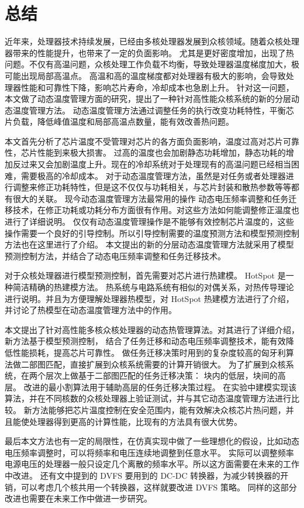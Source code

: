 
\chapter{总结}

近年来，处理器技术持续发展，已经由多核处理器发展到众核领域。随着众核处理器带来的性能提升，也带来了一定的负面影响。
尤其是更好密度增加，出现了热问题。不仅有高温问题，众核处理工作负载不均衡，导致处理器温度梯度加大，极可能出现局部高温点。
高温和高的温度梯度都对处理器有极大的影响，会导致处理器性能和可靠性下降，影响芯片寿命，冷却成本也急剧上升。
针对这一问题，本文做了动态温度管理方面的研究，提出了一种针对高性能众核系统的新的分层动态温度管理方法。
动态温度管理方法通过调整任务的执行改变功耗特性，平衡芯片负载，降低峰值温度和局部高温点数量，能有效改善热问题。

本文首先分析了芯片温度不受管理对芯片的各方面负面影响，温度过高对芯片可靠性，芯片性能到来极大损害。
过高的温度也会加剧静态功耗增加，静态功耗的增加反过来又会加剧温度上升。现在的冷却系统对于处理现有的高温问题已经相当困难，需要极高的冷却成本。
对于动态温度管理方法，虽然是对任务或者处理器进行调整来修正功耗特性，但是这不仅仅与功耗相关，与芯片封装和散热参数等等都有很大的关联。
现今动态温度管理方法最常用的操作 动态电压频率调整和任务迁移技术，在修正功耗或功耗分布方面很有作用。对这些方法如何能调整修正温度也进行了详细说明。
仅仅有动态温度管理操作是不能够有效控制芯片温度的，这些操作需要一个良好的引导控制。所以引导控制需要的温度预测方法和模型预测控制方法也在这里进行了介绍。
本文提出的新的分层动态温度管理方法就采用了模型预测控制方法，并结合了动态电压频率调整和任务迁移技术。

对于众核处理器进行模型预测控制，首先需要对芯片进行热建模。 HotSpot 是一种简洁精确的热建模方法。
热系统与电路系统有相似的对偶关系，对热传导理论进行说明。并且为方便理解处理器热模型，对 HotSpot 热建模方法进行了介绍，
并讨论了热模型在动态温度管理方法中的作用。

本文提出了针对高性能多核众核处理器的动态热管理算法。对其进行了详细介绍，新方法基于模型预测控制，
结合了任务迁移和动态电压频率调整技术，能有效降低性能损耗，提高芯片可靠性。
做任务迁移决策时用到的复杂度较高的匈牙利算法做二部图匹配，直接扩展到众核系统需要的计算开销很大。
为了扩展到众核系统，在两个层次上做基于二部图匹配的任务迁移决策：
块内的低层，块间的高层。
改进的最小割算法用于辅助高层的任务迁移决策过程。
在实验中建模实现该算法，并在不同核数的众核处理器上验证测试，并与其它动态温度管理方法进行比较。
新方法能够把芯片温度控制在安全范围内，能有效解决众核芯片热问题，并且能使处理器得到更高的计算性能，比现有的方法具有很大优势。

最后本文方法也有一定的局限性，在仿真实现中做了一些理想化的假设，比如动态电压频率调整时，可以将频率和电压连续地调整到任意水平。
实际可以调整频率电源电压的处理器一般只设定几个离散的频率水平。所以这方面需要在未来的工作中改进。
还有文中提到的 DVFS 要用到的 DC-DC 转换器，为减少转换器的开销，可以考虑几个核共用一个转换器，这样就要改进 DVFS 策略。
同样的这部分改进也需要在未来工作中做进一步研究。






























